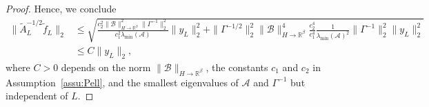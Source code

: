 \documentclass[11pt,english]{article}
\theoremstyle{plain}
\theoremstyle{plain}
\theoremstyle{plain}
\theoremstyle{plain}
\numberwithin{equation}{section}
\begin{document}
\begin{proof}
	Hence, we conclude
	\begin{align*}
		\|\widetilde{A}_{L}^{-1/2}\widetilde{f}_{L}\|_{2} & \leq\sqrt{\frac{c_{2}^{2}\|\mathcal{B}\|_{H\to\mathbb{R}^{\beta}}^{2}\|\Gamma^{-1}\|_{2}^{2}}{c_{1}^{2}\lambda_{\mathrm{min}}(\mathcal{A})}\|y_{L}\|_{2}^{2}+\|\Gamma^{-1/2}\|_{2}^{2}\|\mathcal{B}\|_{H\to\mathbb{R}^{\beta}}^{4}\frac{c_{2}^{4}}{c_{1}^{4}}\frac{1}{\lambda_{\mathrm{min}}(\mathcal{A})^{2}}\|\Gamma^{-1}\|_{2}^{2}\|y_{L}\|_{2}^{2}} \\
		                                                           & \leq C\|y_{L}\|_{2},
	\end{align*}
	where $C>0$ depends on the norm $\|\mathcal{B}\|_{H\to\mathbb{R}^{\beta}}$,
	the constants $c_{1}$ and $c_{2}$ in Assumption~\ref{assu:Pell},
	and the smallest eigenvalues of $\mathcal{A}$ and $\Gamma^{-1}$
	but independent of $L$.
\end{proof}
\end{document}
